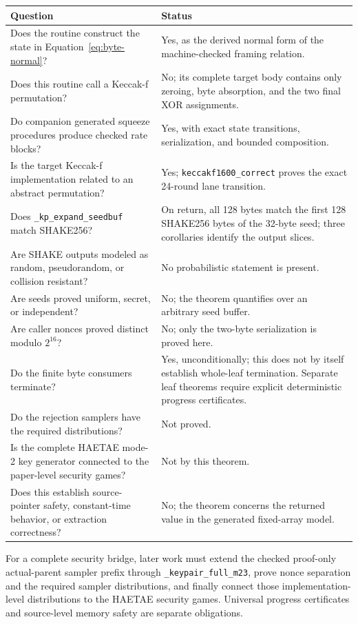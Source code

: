 \documentclass[11pt]{article}
\theoremstyle{definition}
\theoremstyle{plain}
\theoremstyle{remark}
\newcommand{\code}[1]{\nolinkurl{#1}}
\begin{document}
\noindent\begin{tabularx}{\textwidth}{>{\raggedright\arraybackslash}p{}X}
\toprule
Question & Status \\
\midrule
Does the routine construct the state in Equation~\eqref{eq:byte-normal}? &
Yes, as the derived normal form of the machine-checked framing relation. \\
Does this routine call a Keccak-f permutation? &
No; its complete target body contains only zeroing, byte absorption, and the
two final XOR assignments. \\
Do companion generated squeeze procedures produce checked rate blocks? &
Yes, with exact state transitions, serialization, and bounded composition. \\
Is the target Keccak-f implementation related to an abstract permutation? &
Yes; \code{keccakf1600_correct} proves the exact 24-round lane transition. \\
Does \code{_kp_expand_seedbuf} match SHAKE256? &
On return, all 128 bytes match the first 128 SHAKE256 bytes of the 32-byte seed; three corollaries identify the output slices. \\
Are SHAKE outputs modeled as random, pseudorandom, or collision resistant? &
No probabilistic statement is present. \\
Are seeds proved uniform, secret, or independent? &
No; the theorem quantifies over an arbitrary seed buffer. \\
Are caller nonces proved distinct modulo $2^{16}$? &
No; only the two-byte serialization is proved here. \\
Do the finite byte consumers terminate? &
Yes, unconditionally; this does not by itself establish whole-leaf
termination.  Separate leaf theorems require explicit deterministic progress
certificates. \\
Do the rejection samplers have the required distributions? &
Not proved. \\
Is the complete HAETAE mode-2 key generator connected to the paper-level
security games? &
Not by this theorem. \\
Does this establish source-pointer safety, constant-time behavior, or
extraction correctness? &
No; the theorem concerns the returned value in the generated fixed-array
model. \\
\bottomrule
\end{tabularx}

For a complete security bridge, later work must extend the checked proof-only
actual-parent sampler prefix through \code{_keypair_full_m23}, prove nonce
separation and the required sampler distributions, and finally connect those
implementation-level distributions to the HAETAE security games.  Universal
progress certificates and source-level memory safety are separate obligations.
\end{document}
